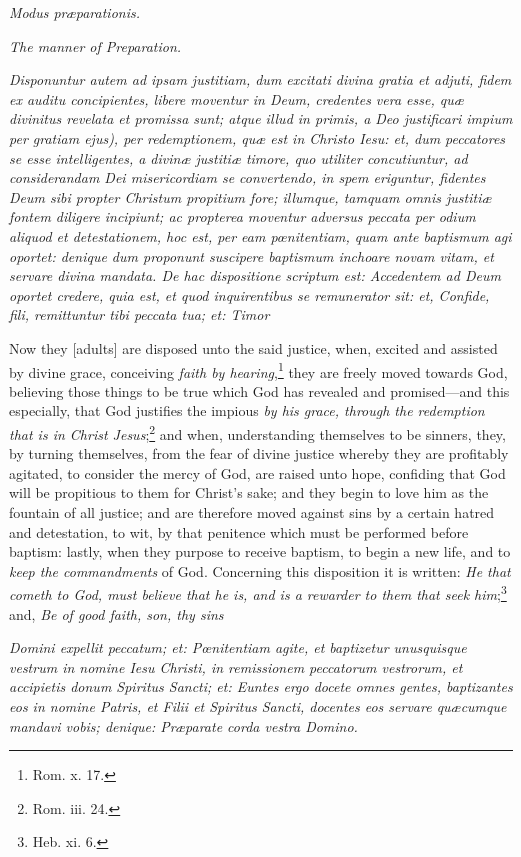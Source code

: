 \emph{Modus præparationis.}

\emph{The manner of Preparation.}

\emph{Disponuntur autem ad ipsam justitiam, dum excitati divina gratia et adjuti, fidem ex auditu concipientes, libere moventur in Deum, credentes vera esse, quæ divinitus revelata et promissa sunt; atque illud in primis, a Deo justificari impium per gratiam ejus), per redemptionem, quæ est in Christo Iesu: et, dum peccatores se esse intelligentes, a divinæ justitiæ timore, quo utiliter concutiuntur, ad considerandam Dei misericordiam se convertendo, in spem eriguntur, fidentes Deum sibi propter Christum propitium fore; illumque, tamquam omnis justitiæ fontem diligere incipiunt; ac propterea moventur adversus peccata per odium aliquod et detestationem, hoc est, per eam pœnitentiam, quam ante baptismum agi oportet: denique dum proponunt suscipere baptismum inchoare novam vitam, et servare divina mandata. De hac dispositione scriptum est: Accedentem ad Deum oportet credere, quia est, et quod inquirentibus se remunerator sit: et, Confide, fili, remittuntur tibi peccata tua; et: Timor }

Now they [adults] are disposed unto the said justice, when, excited and assisted by divine grace, conceiving \emph{faith by hearing},\footnote{\par   Rom. x. 17.} they are freely moved towards God, believing those things to be true which God has revealed and promised—and this especially, that God justifies the impious \emph{by his grace, through the redemption that is in Christ Jesus};\footnote{\par   Rom. iii. 24.} and when, understanding themselves to be sinners, they, by turning themselves, from the fear of divine justice whereby they are profitably agitated, to consider the mercy of God, are raised unto hope, confiding that God will be propitious to them for Christ's sake; and they begin to love him as the fountain of all justice; and are therefore moved against sins by a certain hatred and detestation, to wit, by that penitence which must be performed before baptism: lastly, when they purpose to receive baptism, to begin a new life, and to \emph{keep the commandments} of God. Concerning this disposition it is written: \emph{He that cometh to God, must believe that he is, and is a rewarder to them that seek him};\footnote{\par   Heb. xi. 6.} and, \emph{Be of good faith, son, thy sins}

\emph{Domini expellit peccatum; et: Pœnitentiam agite, et baptizetur unusquisque vestrum in nomine Iesu Christi, in remissionem peccatorum vestrorum, et accipietis donum Spiritus Sancti; et: Euntes ergo docete omnes gentes, baptizantes eos in nomine Patris, et Filii et Spiritus Sancti, docentes eos servare quæcumque mandavi vobis; denique: Præparate corda vestra Domino.}


